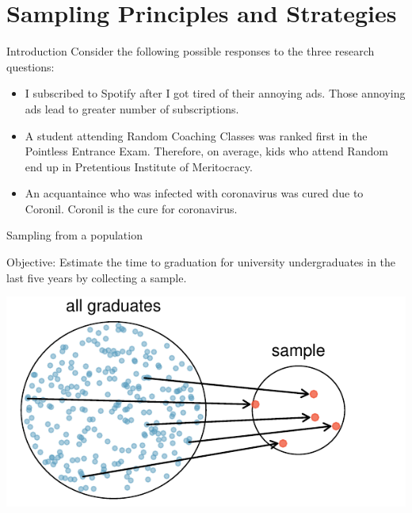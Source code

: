 \documentclass[notes,11pt, aspectratio=169]{beamer}
\begin{document}
\section{Sampling Principles and Strategies}

\begin{frame}{Introduction}
Consider the following possible responses to the three research questions:
\begin{itemize}
\item I subscribed to Spotify after I got tired of their annoying ads. Those annoying ads lead to greater number of subscriptions.
\item A student attending Random Coaching Classes was ranked first in the Pointless Entrance Exam. Therefore, on average, kids who attend Random end up in Pretentious Institute of Meritocracy.
\item An acquantaince who was infected with coronavirus was cured due to Coronil. Coronil is the cure for coronavirus.
\end{itemize}
\end{frame}

\begin{frame}{Sampling from a population}

Objective: Estimate the time to graduation for university undergraduates in the last five years by collecting a sample.
\begin{center}
\includegraphics[scale=0.8]{graphs/popToSampleGraduates}
\end{center}

\end{frame}
\end{document}
